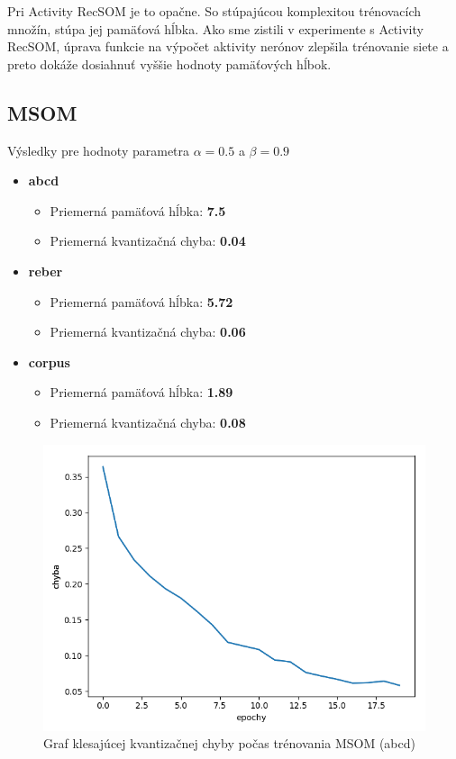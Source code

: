 Pri Activity RecSOM je to opačne. So stúpajúcou komplexitou trénovacích množín, 
stúpa jej pamäťová hĺbka. Ako sme zistili v experimente s Activity RecSOM, úprava funkcie 
na výpočet aktivity nerónov zlepšila trénovanie siete a preto dokáže dosiahnuť vyššie hodnoty
pamäťových hĺbok.


\subsection{MSOM}
Výsledky pre hodnoty parametra $\alpha = 0.5$ a $\beta = 0.9$
\begin{itemize}
    \item \textbf{abcd}
    \begin{itemize}
        \item Priemerná pamäťová hĺbka: \textbf{7.5}
        \item Priemerná kvantizačná chyba: \textbf{0.04}
    \end{itemize}
    \item \textbf{reber}
    \begin{itemize}
        \item Priemerná pamäťová hĺbka: \textbf{5.72}
        \item Priemerná kvantizačná chyba: \textbf{0.06}
    \end{itemize}
    \item \textbf{corpus}
    \begin{itemize}
        \item Priemerná pamäťová hĺbka: \textbf{1.89}
        \item Priemerná kvantizačná chyba: \textbf{0.08}
    \end{itemize}
\end{itemize}

\begin{figure}[H]
    \centering
    \includegraphics[width=\textwidth]{assets/m_error_top}
    \caption{Graf klesajúcej kvantizačnej chyby počas trénovania MSOM (abcd)}
\end{figure}

